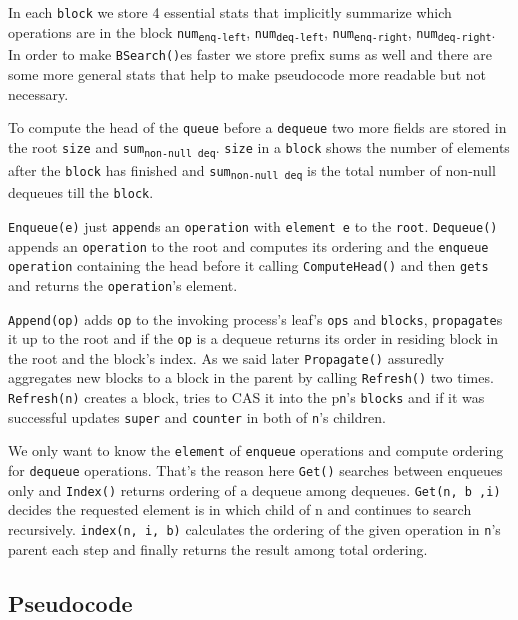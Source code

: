 \documentclass[10pt]{article}
\theoremstyle{definition}
\begin{document}
In each \texttt{block} we store 4 essential stats that implicitly summarize which operations are in the block \texttt{num\textsubscript{enq-left}}, \texttt{num\textsubscript{deq-left}}, \texttt{num\textsubscript{enq-right}}, \texttt{num\textsubscript{deq-right}}. In order to make \texttt{BSearch()}es faster we store prefix sums as well and there are some more general stats that help to make pseudocode more readable but not necessary.

To compute the head of the \texttt{queue} before a \texttt{dequeue} two more fields are stored in the root \texttt{size} and \texttt{sum\textsubscript{non-null deq}}. \texttt{size} in a \texttt{block} shows the number of elements after the \texttt{block} has finished and \texttt{sum\textsubscript{non-null deq}} is the total number of non-null dequeues till the \texttt{block}.

\texttt{Enqueue(e)} just \texttt{append}s an \texttt{operation} with \texttt{element e} to the \texttt{root}. \texttt{Dequeue()} appends an \texttt{operation} to the root and computes its ordering and the \texttt{enqueue operation} containing the head before it calling \texttt{ComputeHead()} and then \texttt{gets} and returns the \texttt{operation}'s element.

\texttt{Append(op)} adds \texttt{op} to the invoking process's leaf's \texttt{ops} and \texttt{blocks}, \texttt{propagate}s it up to the root and if the \texttt{op} is a dequeue returns its order in residing block in the root and the block's index. As we said later \texttt{Propagate()} assuredly aggregates new blocks to a block in the parent by calling \texttt{Refresh()} two times. \texttt{Refresh(n)} creates a block, tries to CAS it into the p\texttt{n}'s \texttt{blocks} and if it was successful updates \texttt{super} and \texttt{counter} in both of \texttt{n}'s children.

We only want to know the \texttt{element} of \texttt{enqueue} operations and compute ordering for \texttt{dequeue} operations. That's the reason here \texttt{Get()} searches between enqueues only and \texttt{Index()} returns ordering of a dequeue among dequeues. \texttt{Get(n, b ,i)} decides the requested element is in which child of n and continues to search recursively. \texttt{index(n, i, b)} calculates the ordering of the given operation in \texttt{n}'s parent each step and finally returns the result among total ordering.

\pagebreak
\subsection{Pseudocode}
\end{document}
